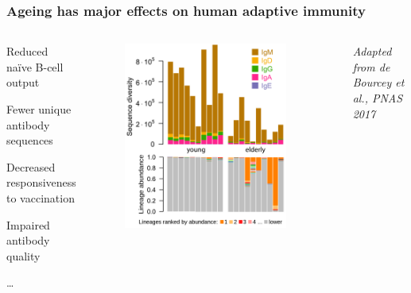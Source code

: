\documentclass[presentation]{beamer}
\begin{document}
\begin{frame}
\frametitle{Ageing has major effects on human adaptive immunity}\pause
\begin{columns}
\begin{wideitemize}{0.5}
\item Reduced na\"ive B-cell output
\item Fewer unique antibody sequences
\item Decreased responsiveness to vaccination
\item Impaired antibody quality
\item \dots
\end{wideitemize}\pause
{}
\begin{figure}
\includegraphics[width=0.90\textwidth]{figs/png/2017_deBourcy_adapted_2groups}
\end{figure}
\begin{flushright}\textit{\scriptsize Adapted from de Bourcey et al., PNAS 2017}\end{flushright}
\end{columns}
\end{frame}
\end{document}

